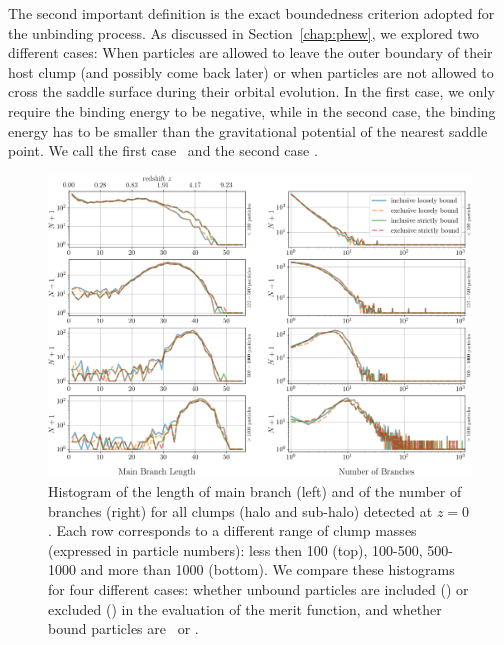 The second important definition is the exact boundedness criterion
adopted for the unbinding process.  As discussed in
Section~\ref{chap:phew}, we explored two different cases: When
particles are allowed to leave the outer boundary of their host clump
(and possibly come back later) or when particles are not allowed to
cross the saddle surface during their orbital evolution. In the first
case, we only require the binding energy to be negative, while in the
second case, the binding energy has to be smaller than the
gravitational potential of the nearest saddle point.  We call the
first case \nosad\ and the second case \sad.

\begin{figure}
  \centering
  \includegraphics[width=\textwidth,keepaspectratio]{images/tree-statistics-my-threshold/tree_geometry-inc-excl.png}
  \caption{Histogram of the length of main branch (left) and of the
    number of branches (right) for all clumps (halo and sub-halo)
    detected at $z=0$. Each row corresponds to a different range of
    clump masses (expressed in particle numbers): less then 100 (top),
    100-500, 500-1000 and more than 1000 (bottom). We compare these
    histograms for four different cases: whether unbound particles are
    included (\inc) or excluded (\exc) in the evaluation of the merit
    function, and whether bound particles are \nosad\ or \sad.
  }%
  \label{fig:saddle_nosaddle_mbl_nbranch}
\end{figure}

